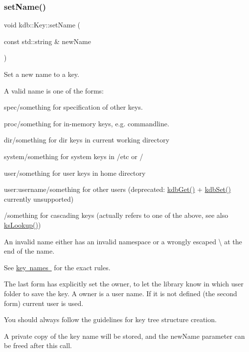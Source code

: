 \subsubsection{\texorpdfstring{setName()}{setName()}}
{\footnotesize\ttfamily void kdb\+::\+Key\+::set\+Name (\begin{DoxyParamCaption}\item[{const std\+::string \&}]{new\+Name }\end{DoxyParamCaption})\hspace{0.3cm}{\ttfamily [inline]}}



Set a new name to a key. 

A valid name is one of the forms\+:
\begin{DoxyItemize}
\item {\ttfamily spec/something} for specification of other keys.
\item {\ttfamily proc/something} for in-\/memory keys, e.\+g. commandline.
\item {\ttfamily dir/something} for dir keys in current working directory
\item {\ttfamily system/something} for system keys in /etc or /
\item {\ttfamily user/something} for user keys in home directory
\item {\ttfamily user\+:username/something} for other users (deprecated\+: \mbox{\hyperlink{group__kdb_ga28e385fd9cb7ccfe0b2f1ed2f62453a1}{kdb\+Get()}} + \mbox{\hyperlink{group__kdb_ga11436b058408f83d303ca5e996832bcf}{kdb\+Set()}} currently unsupported)
\item {\ttfamily /something} for cascading keys (actually refers to one of the above, see also \mbox{\hyperlink{group__keyset_gaa34fc43a081e6b01e4120daa6c112004}{ks\+Lookup()}})
\end{DoxyItemize}

An invalid name either has an invalid namespace or a wrongly escaped \textbackslash{} at the end of the name.

See \mbox{\hyperlink{group__keyname}{key names }} for the exact rules.

The last form has explicitly set the owner, to let the library know in which user folder to save the key. A owner is a user name. If it is not defined (the second form) current user is used.

You should always follow the guidelines for key tree structure creation.

A private copy of the key name will be stored, and the {\ttfamily new\+Name} parameter can be freed after this call.

